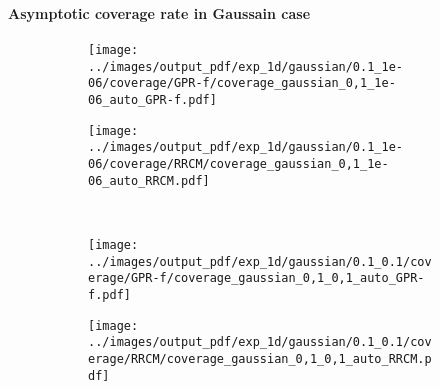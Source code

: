 \documentclass[t]{beamer}  %
\begin{document}
\begin{frame}[t]\frametitle{\insertsection}
  \framesubtitle{Asymptotic coverage rate in Gaussain case}
  \begin{figure}
    \centering
    \begin{subfigure}[b]{0.45\linewidth}
      \texttt{[image: ../images/output\_pdf/exp\_1d/gaussian/0.1\_1e-06/coverage/GPR-f/coverage\_gaussian\_0,1\_1e-06\_auto\_GPR-f.pdf]}
    \end{subfigure}%
    \begin{subfigure}[b]{0.45\linewidth}
      \texttt{[image: ../images/output\_pdf/exp\_1d/gaussian/0.1\_1e-06/coverage/RRCM/coverage\_gaussian\_0,1\_1e-06\_auto\_RRCM.pdf]}
    \end{subfigure}\\
    \begin{subfigure}[b]{0.45\linewidth}
      \texttt{[image: ../images/output\_pdf/exp\_1d/gaussian/0.1\_0.1/coverage/GPR-f/coverage\_gaussian\_0,1\_0,1\_auto\_GPR-f.pdf]}
    \end{subfigure}%
    \begin{subfigure}[b]{0.45\linewidth}
      \texttt{[image: ../images/output\_pdf/exp\_1d/gaussian/0.1\_0.1/coverage/RRCM/coverage\_gaussian\_0,1\_0,1\_auto\_RRCM.pdf]}
    \end{subfigure}\\
    \label{fig:gaussian_1d_high_noise}
  \end{figure}
\end{frame}
\end{document}
